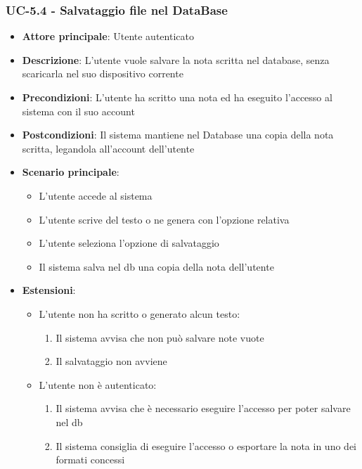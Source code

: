 \documentclass[11pt,a4paper]{article}
\begin{document}
\subsubsection{UC-5.4 - Salvataggio file nel DataBase}
\begin{itemize}
    \item \textbf{Attore principale}: Utente autenticato
    \item \textbf{Descrizione}: L'utente vuole salvare la nota scritta nel database, senza scaricarla nel suo dispositivo corrente
    \item \textbf{Precondizioni}: L'utente ha scritto una nota ed ha eseguito l'accesso al sistema con il suo account
    \item \textbf{Postcondizioni}: Il sistema mantiene nel Database una copia della nota scritta, legandola all'account dell'utente
    \item \textbf{Scenario principale}:
        \begin{itemize}
            \item L'utente accede al sistema
            \item L'utente scrive del testo o ne genera con l'opzione relativa
            \item L'utente seleziona l'opzione di salvataggio
            \item Il sistema salva nel db una copia della nota dell'utente
        \end{itemize}
    \item \textbf{Estensioni}:
        \begin{itemize}
            \item L'utente non ha scritto o generato alcun testo:
                \begin{enumerate}
                    \item Il sistema avvisa che non può salvare note vuote
                    \item Il salvataggio non avviene
                \end{enumerate}
            \item L'utente non è autenticato:
                \begin{enumerate}
                    \item Il sistema avvisa che è necessario eseguire l'accesso per poter salvare nel db
                    \item Il sistema consiglia di eseguire l'accesso o esportare la nota in uno dei formati concessi
                \end{enumerate}
        \end{itemize}
\end{itemize}
\end{document}
